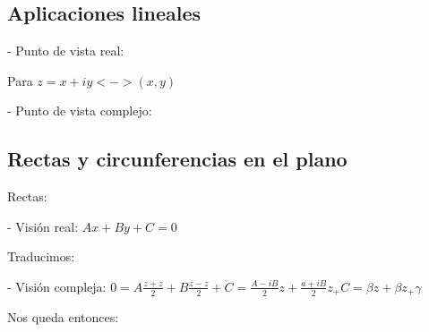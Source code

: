 \subsection{Aplicaciones lineales}

- Punto de vista real:


Para \(z = x+iy <-> (x,y) \) %


- Punto de vista complejo:


\subsection{Rectas y circunferencias en el plano}

Rectas:

- Visión real: \(Ax + By + C = 0\)

Traducimos:

- Visión compleja: \(0 = A \frac{z+z}{2}+B \frac{z-z}{2} + C = \frac{A-iB}{2}z+\frac{a+iB}{2}z_ + C = \beta z + \beta z_ + \gamma \) 

Nos queda entonces:







